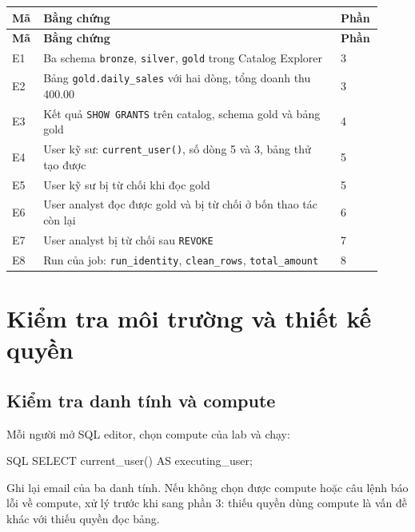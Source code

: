 \begingroup\small
\renewcommand{\arraystretch}{1.2}
\begin{longtable}{@{}p{0.08\linewidth}p{0.76\linewidth}p{0.08\linewidth}@{}}
\toprule
\rowcolor{rowLavender}
\textbf{Mã} & \textbf{Bằng chứng} & \textbf{Phần} \\
\midrule
\endfirsthead
\toprule
\rowcolor{rowLavender}
\textbf{Mã} & \textbf{Bằng chứng} & \textbf{Phần} \\
\midrule
\endhead
\bottomrule
\endfoot
E1 & Ba schema \texttt{bronze}, \texttt{silver}, \texttt{gold} trong Catalog Explorer & 3 \\
E2 & Bảng \texttt{gold.\allowbreak{}daily\_\allowbreak{}sales} với hai dòng, tổng doanh thu 400.00 & 3 \\
E3 & Kết quả \texttt{SHOW GRANTS} trên catalog, schema gold và bảng gold & 4 \\
E4 & User kỹ sư: \texttt{current\_\allowbreak{}user()}, số dòng 5 và 3, bảng thử tạo được & 5 \\
E5 & User kỹ sư bị từ chối khi đọc gold & 5 \\
E6 & User analyst đọc được gold và bị từ chối ở bốn thao tác còn lại & 6 \\
E7 & User analyst bị từ chối sau \texttt{REVOKE} & 7 \\
E8 & Run của job: \texttt{run\_\allowbreak{}identity}, \texttt{clean\_\allowbreak{}rows}, \texttt{total\_\allowbreak{}amount} & 8 \\
\end{longtable}
\endgroup

\section{Kiểm tra môi trường và thiết kế quyền}

\subsection{Kiểm tra danh tính và compute}

Mỗi người mở SQL editor, chọn compute của lab và chạy:


\begin{aivncodebox}[language={}]{SQL}
SELECT current_user() AS executing_user;
\end{aivncodebox}

Ghi lại email của ba danh tính. Nếu không chọn được compute hoặc câu lệnh báo lỗi về compute, xử lý trước khi sang phần 3: thiếu quyền dùng compute là vấn đề khác với thiếu quyền đọc bảng.


